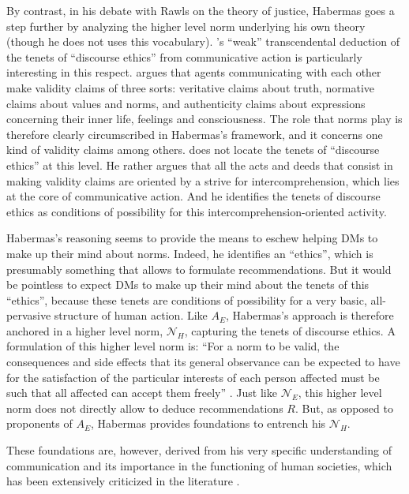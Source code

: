 \documentclass[preprint, french, english, 11pt, authoryear]{elsarticle}%
\begin{document}
By contrast, in his debate with Rawls on the theory of justice, Habermas goes a step further by analyzing the higher level norm underlying his own theory (though he does not uses this vocabulary). \citet{habermas_moralbewustsein_1983}'s “weak” transcendental deduction of the tenets of “discourse ethics” from communicative action is particularly interesting in this respect. \citet{habermas_theorie_1981} argues that agents communicating with each other make validity claims of three sorts: veritative claims about truth, normative claims about values and norms, and authenticity claims about expressions concerning their inner life, feelings and consciousness. The role that norms play is therefore clearly circumscribed in Habermas's framework, and it concerns one kind of validity claims among others. \cite{habermas_moralbewustsein_1983} does not locate the tenets of “discourse ethics” at this level. He rather argues that all the acts and deeds that consist in making validity claims are oriented by a strive for intercomprehension, which lies at the core of communicative action. And he identifies the tenets of discourse ethics as conditions of possibility for this intercomprehension-oriented activity. 

Habermas's reasoning seems to provide the means to eschew helping \acp{DM} to make up their mind about norms. Indeed, he identifies an “ethics”, which is presumably something that allows to formulate recommendations. But it would be pointless to expect \acp{DM} to make up their mind about the tenets of this “ethics”, because these tenets are conditions of possibility for a very basic, all-pervasive structure of human action. Like $A_E$, Habermas's approach is therefore anchored in a higher level norm, $\mathscr{N}_{H}$, capturing the tenets of discourse ethics. A formulation of this higher level norm is: “For a norm to be valid, the consequences and side effects that its general observance can be expected to have for the satisfaction of the particular interests of each person affected must be such that all affected can accept them freely” \citep{habermas_moralbewustsein_1983}. Just like $\mathscr{N}_E$, this higher level norm does not directly allow to deduce recommendations $R$. But, as opposed to proponents of $A_E$, Habermas provides foundations to entrench his $\mathscr{N}_{H}$. 

These foundations are, however, derived from his very specific understanding of communication and its importance in the functioning of human societies, which has been extensively criticized in the literature \citep{heath_communicative_2001,honneth_kritik_1985,benhabib_situating_1992}. 
\end{document}
